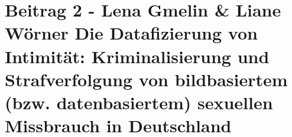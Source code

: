 \section*{Beitrag 2 - Lena Gmelin \& Liane Wörner
Die Datafizierung von Intimität: Kriminalisierung und Strafverfolgung von bildbasiertem (bzw. datenbasiertem) sexuellen Missbrauch in Deutschland}